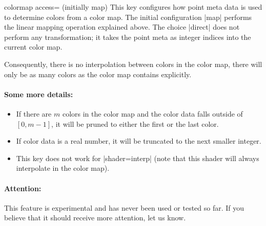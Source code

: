 \begin{pgfplotskey}{colormap access= (initially map)}
	This key configures how point meta data is used to determine colors from a color map. The initial configuration |map| performs the linear mapping operation explained above. The choice |direct| does not perform any transformation; it takes the point meta as integer indices into the current color map. 

	Consequently, there is no interpolation between colors in the color map, there will only be as many colors as the color map contains explicitly.

	\paragraph{Some more details:}
	\begin{itemize}
		\item If there are $m$ colors in the color map and the color data falls outside of $[0,m-1]$, it will be pruned to either the first or the last color.
		\item If color data is a real number, it will be truncated to the next smaller integer.
		\item 
	This key does not work for |shader=interp| (note that this shader will always interpolate in the color map).
	\end{itemize}
	\paragraph{Attention:} This feature is experimental and has never been used or tested so far. If you believe that it should receive more attention, let us know. 
\end{pgfplotskey}

